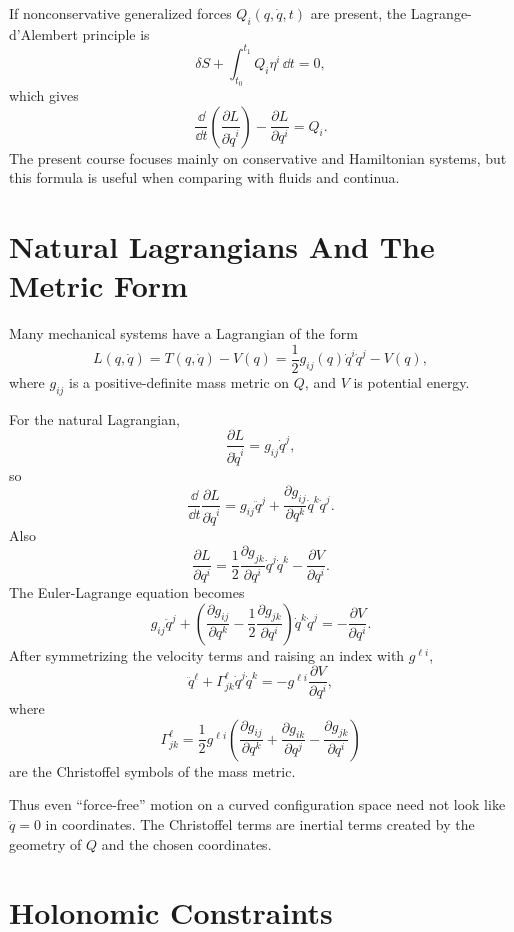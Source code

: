 If nonconservative generalized forces \(Q_i(q,\dot q,t)\) are present, the
Lagrange-d'Alembert principle is
\[
  \delta S+\int_{t_0}^{t_1}Q_i\eta^i\,\dd t=0,
\]
which gives
\[
  \frac{\dd}{\dd t}\left(\frac{\partial L}{\partial \dot q^i}\right)
  -
  \frac{\partial L}{\partial q^i}
  =
  Q_i.
\]
The present course focuses mainly on conservative and Hamiltonian systems, but
this formula is useful when comparing with fluids and continua.

\section{Natural Lagrangians And The Metric Form}
\label{sec:natural-lagrangians}

Many mechanical systems have a Lagrangian of the form
\[
  L(q,\dot q)=T(q,\dot q)-V(q)
  =
  \frac{1}{2}g_{ij}(q)\dot q^i\dot q^j - V(q),
\]
where \(g_{ij}\) is a positive-definite mass metric on \(Q\), and \(V\) is
potential energy.

\begin{derivation}
For the natural Lagrangian,
\[
  \frac{\partial L}{\partial \dot q^i}=g_{ij}\dot q^j,
\]
so
\[
  \frac{\dd}{\dd t}\frac{\partial L}{\partial \dot q^i}
  =
  g_{ij}\ddot q^j
  +
  \frac{\partial g_{ij}}{\partial q^k}\dot q^k\dot q^j.
\]
Also
\[
  \frac{\partial L}{\partial q^i}
  =
  \frac{1}{2}\frac{\partial g_{jk}}{\partial q^i}\dot q^j\dot q^k
  -
  \frac{\partial V}{\partial q^i}.
\]
The Euler-Lagrange equation becomes
\[
  g_{ij}\ddot q^j
  +
  \left(
    \frac{\partial g_{ij}}{\partial q^k}
    -
    \frac{1}{2}\frac{\partial g_{jk}}{\partial q^i}
  \right)\dot q^k\dot q^j
  =
  -\frac{\partial V}{\partial q^i}.
\]
After symmetrizing the velocity terms and raising an index with \(g^{\ell i}\),
\[
  \boxed{
  \ddot q^\ell+\Gamma^\ell_{jk}\dot q^j\dot q^k
  =
  -g^{\ell i}\frac{\partial V}{\partial q^i}
  },
\]
where
\[
  \Gamma^\ell_{jk}
  =
  \frac{1}{2}g^{\ell i}
  \left(
    \frac{\partial g_{ij}}{\partial q^k}
    +
    \frac{\partial g_{ik}}{\partial q^j}
    -
    \frac{\partial g_{jk}}{\partial q^i}
  \right)
\]
are the Christoffel symbols of the mass metric.
\end{derivation}

Thus even ``force-free'' motion on a curved configuration space need not look
like \(\ddot q=0\) in coordinates. The Christoffel terms are inertial terms
created by the geometry of \(Q\) and the chosen coordinates.

\section{Holonomic Constraints}
\label{sec:holonomic-constraints}

